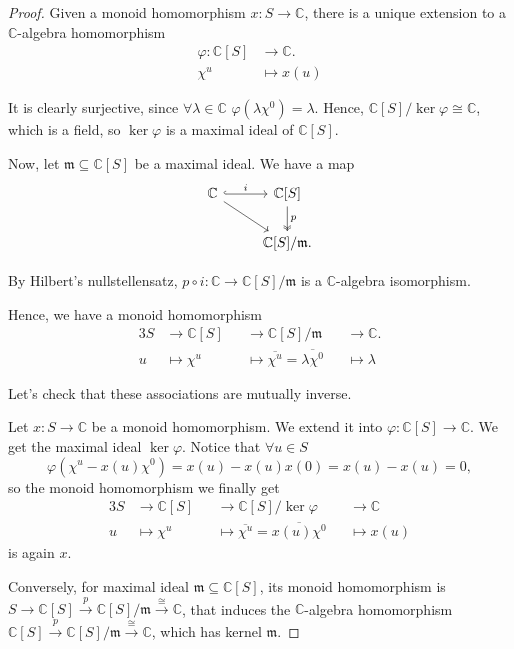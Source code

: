 \documentclass[12pt]{article}
\theoremstyle{definition}
\begin{document}
\begin{proof}
Given a monoid homomorphism $x:S\rightarrow\mathbb{C}$, there is a unique extension to a $\mathbb{C}$-algebra homomorphism
\begin{align*}
\varphi:\mathbb{C}[S]&\longrightarrow\mathbb{C}.\\
\chi^u&\longmapsto x(u)
\end{align*}

It is clearly surjective, since $\forall\lambda\in\mathbb{C}$ $\varphi(\lambda\chi^0)=\lambda$. Hence, $\mathbb{C}[S]/\ker\varphi\cong\mathbb{C}$, which is a field, so $\ker\varphi$ is a maximal ideal of $\mathbb{C}[S]$.

Now, let $\mathfrak{m}\subseteq\mathbb{C}[S]$ be a maximal ideal. We have a map
\[\begin{tikzcd}\mathbb{C}\arrow[r,hook,"i"]\arrow[rd]&\mathbb{C}[S]\arrow[d,twoheadrightarrow,"p"]\\&\mathbb{C}[S]/\mathfrak{m}.\end{tikzcd}\]

By Hilbert's nullstellensatz, $p\circ i:\mathbb{C}\rightarrow\mathbb{C}[S]/\mathfrak{m}$ is a $\mathbb{C}$-algebra isomorphism.

Hence, we have a monoid homomorphism
\begin{alignat*}{3}
S&\longrightarrow\mathbb{C}[S]&&\longrightarrow\mathbb{C}[S]/\mathfrak{m}&&\longrightarrow\mathbb{C}.\\
u&\longmapsto\chi^u&&\longmapsto\overline{\chi^u}=\overline{\lambda\chi^0}&&\longmapsto\lambda
\end{alignat*}

Let's check that these associations are mutually inverse.

Let $x:S\rightarrow\mathbb{C}$ be a monoid homomorphism. We extend it into $\varphi:\mathbb{C}[S]\rightarrow\mathbb{C}$. We get the maximal ideal $\ker\varphi$. Notice that $\forall u\in S$
\[\varphi(\chi^u-x(u)\chi^0)=x(u)-x(u)x(0)=x(u)-x(u)=0,\]
so the monoid homomorphism we finally get
\begin{alignat*}{3}
S&\longrightarrow\mathbb{C}[S]&&\longrightarrow\mathbb{C}[S]/\ker\varphi&&\longrightarrow\mathbb{C}\\
u&\longmapsto\chi^u&&\longmapsto\overline{\chi^u}=\overline{x(u)\chi^0}&&\longmapsto x(u)
\end{alignat*}
is again $x$.

Conversely, for maximal ideal $\mathfrak{m}\subseteq\mathbb{C}[S]$, its monoid homomorphism is $S\rightarrow\mathbb{C}[S]\overset{p}{\rightarrow}\mathbb{C}[S]/\mathfrak{m}\overset{\cong}{\rightarrow}\mathbb{C}$, that induces the $\mathbb{C}$-algebra homomorphism $\mathbb{C}[S]\overset{p}{\rightarrow}\mathbb{C}[S]/\mathfrak{m}\overset{\cong}{\rightarrow}\mathbb{C}$, which has kernel $\mathfrak{m}$.
\end{proof}
\end{document}
